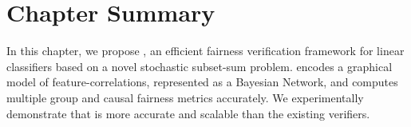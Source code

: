 \section{Chapter Summary}
In this chapter, we propose {\fvgm}, an efficient fairness verification framework for linear classifiers based on a novel stochastic subset-sum problem. {\fvgm} encodes a graphical model of feature-correlations, represented as a Bayesian Network, and computes multiple group and causal fairness metrics accurately. We experimentally demonstrate that {\fvgm} is  more accurate and scalable than the existing verifiers.
\begin{comment}
\end{comment}

